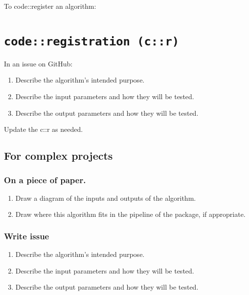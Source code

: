 \documentclass[
]{article}
\providecommand{\tightlist}{%
  \setlength{\itemsep}{0pt}\setlength{\parskip}{0pt}}
\begin{document}
To code::register an algorithm:

\hypertarget{coderegistration-cr-1}{%
\section{\texorpdfstring{\texttt{code::registration\ (c::r)}}{code::registration (c::r)}}\label{coderegistration-cr-1}}

In an issue on GitHub:

\begin{enumerate}
\def\labelenumi{\arabic{enumi}.}
\tightlist
\item
  Describe the algorithm's intended purpose.
\item
  Describe the input parameters and how they will be tested.
\item
  Describe the output parameters and how they will be tested.
\end{enumerate}

Update the c::r as needed.

\hypertarget{for-complex-projects}{%
\subsection{For complex projects}\label{for-complex-projects}}

\hypertarget{on-a-piece-of-paper.}{%
\subsubsection{On a piece of paper.}\label{on-a-piece-of-paper.}}

\begin{enumerate}
\def\labelenumi{\arabic{enumi}.}
\tightlist
\item
  Draw a diagram of the inputs and outputs of the algorithm.
\item
  Draw where this algorithm fits in the pipeline of the package, if appropriate.
\end{enumerate}

\hypertarget{write-issue}{%
\subsubsection{Write issue}\label{write-issue}}

\begin{enumerate}
\def\labelenumi{\arabic{enumi}.}
\tightlist
\item
  Describe the algorithm's intended purpose.
\item
  Describe the input parameters and how they will be tested.
\item
  Describe the output parameters and how they will be tested.
\end{enumerate}
\end{document}
